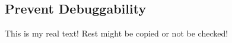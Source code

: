 \subsection{Prevent Debuggability} \label{subsection:subsection:counter-tampering-debuggable}
This is my real text! Rest might be copied or not be checked!
